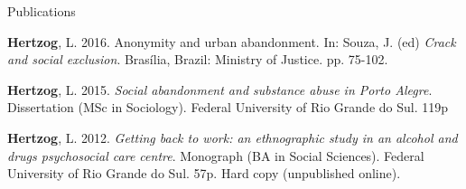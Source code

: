 \begin{rSection}{Publications}
\begin{etaremune}
\item \textbf{Hertzog}, L. 2016. Anonymity and urban abandonment. In: Souza, J. (ed) \textit{Crack and social exclusion}. Brasília, Brazil: Ministry of Justice. pp. 75-102. 
\href{https://cepad.ufes.br/sites/cepad.ufes.br/files/field/anexo/Livro\%20Crack\%20e\%20exclus\%C3\%A3o\%20social_Digital_WEB.pdf}{\textcolor{mydoi}{\aiDoi}} 

\item \textbf{Hertzog}, L. 2015. \textit{Social abandonment and substance abuse in Porto Alegre}. Dissertation (MSc in Sociology). Federal University of Rio Grande do Sul. 119p \href{https://lume.ufrgs.br/handle/10183/116484}{\textcolor{mydoi}{\aiDoi}} 

\item \textbf{Hertzog}, L. 2012. \textit{Getting back to work: an ethnographic study in an alcohol and drugs psychosocial care centre}. Monograph (BA in Social Sciences). Federal University of Rio Grande do Sul. 57p. Hard copy (unpublished online).

\end{etaremune}

\end{rSection}